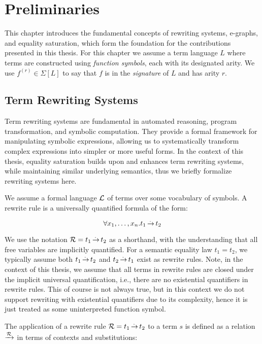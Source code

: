 \chapter{Preliminaries}
\label{chap:prelims}

This chapter introduces the fundamental concepts of rewriting systems, e-graphs, and equality saturation, which form the foundation for the contributions presented in this thesis. 
For this chapter we assume a term language $L$ where terms are constructed using \emph{function symbols}, each with its designated arity.
We use $f^{(r)}\in\Sigma[L]$ to say that $f$ is
in the \emph{signature} of $L$ and has arity $r$.

\section{Term Rewriting Systems}
\label{prelim:term-rewriting}

Term rewriting systems are fundamental in automated reasoning, program transformation, and symbolic computation. 
They provide a formal framework for manipulating symbolic expressions, allowing us to systematically transform complex expressions into simpler or more useful forms. 
In the context of this thesis, equality saturation builds upon and enhances term rewriting systems, while maintaining similar underlying semantics, thus we briefly formalize rewriting systems here.

We assume a formal language $\mathcal{L}$ of terms over some vocabulary of symbols. A rewrite rule is a universally quantified formula of the form:

\[ \forall x_1, \ldots, x_n. t_1 \operatorname{\overset{.\,}{\rightarrow}} t_2 \]

We use the notation $\mathcal{R} = t_1 \operatorname{\overset{.\,}{\rightarrow}} t_2$ as a shorthand, with the understanding that all free variables are implicitly quantified.
For a semantic equality law $t_1 = t_2$, we typically assume both $t_1 \operatorname{\overset{.\,}{\rightarrow}} t_2$ and $t_2 \operatorname{\overset{.\,}{\rightarrow}} t_1$ exist as rewrite rules. 
Note, in the context of this thesis, we assume that all terms in rewrite rules are closed under the implicit universal quantification, i.e., there are no existential quantifiers in rewrite rules.
This of course is not always true, but in this context we do not support rewriting with existential quantifiers due to its complexity, hence it is just treated as some uninterpreted function symbol.

The application of a rewrite rule $\mathcal{R} = t_1 \operatorname{\overset{.\,}{\rightarrow}} t_2$ to a term $s$ is defined as a relation $\xrightarrow[]{\mathcal{R}}$ in terms of contexts and substitutions:

